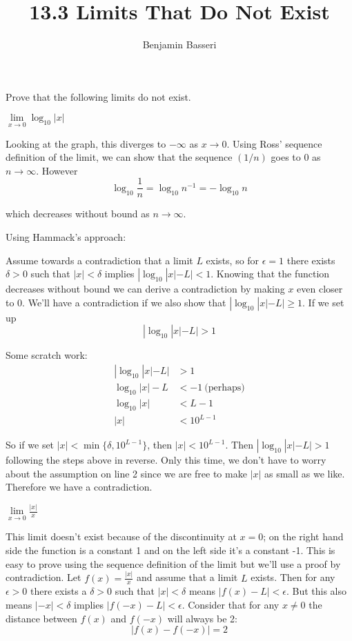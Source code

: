 \documentclass{article}
\title{13.3 Limits That Do Not Exist}
\author{Benjamin Basseri}
\begin{document}
\maketitle
Prove that the following limits do not exist.
\begin{problem}
$\lim\limits_{x \to 0} \log_{10} |x|$
\end{problem}
Looking at the graph, this diverges to $-\infty$ as $x \to 0$. Using Ross' sequence definition of the limit, we can show that the sequence $(1/n)$ goes to 0 as $n \to \infty$. However
$$\log_{10} \frac{1}{n} = \log_{10} n^{-1} = - \log_{10} n$$

which decreases without bound as $n \to \infty$.


Using Hammack's approach:

Assume towards a contradiction that a limit $L$ exists, so for $\epsilon = 1$ there exists $\delta > 0$ such that $|x| < \delta$ implies $|\log_{10} |x| - L | < 1$. Knowing that the function decreases without bound we can derive a contradiction by making $x$ even closer to 0. We'll have a contradiction if we also show that $|\log_{10}|x| - L | \geq 1$. If we set up
$$|\log_{10} |x| - L | > 1$$

Some scratch work:
\begin{align*}
  |\log_{10} |x| - L | & > 1                     \\
  \log_{10} |x| - L    & < -1 \ \text{(perhaps)} \\
  \log_{10} |x|        & < L - 1                 \\
  |x|                  & < 10^{L - 1}
\end{align*}

So if we set $|x| < \min\{\delta, 10^{L -1 }\}$, then $|x| < 10^{L - 1}$. Then $|\log_{10} |x| - L| > 1$ following the steps above in reverse. Only this time, we don't have to worry about the assumption on line 2 since we are free to make $|x|$ as small as we like. Therefore we have a contradiction.

\begin{problem}
$\lim\limits_{x \to 0} \frac{|x|}{x}$
\end{problem}

This limit doesn't exist because of the discontinuity at $x = 0$; on the right hand side the function is a constant 1 and on the left side it's a constant -1. This is easy to prove using the sequence definition of the limit but we'll use a proof by contradiction. Let $f(x) = \frac{|x|}{x}$ and assume that a limit $L$ exists. Then for any $\epsilon > 0$ there exists a $\delta > 0$ such that $|x| < \delta$ means $|f(x) - L| < \epsilon$. But this also means $|-x| < \delta$ implies $|f(-x) - L| < \epsilon$. Consider that for any $x \neq 0$ the distance between $f(x)$ and $f(-x)$ will always be 2:
$$|f(x) - f(-x)| = 2$$
\end{document}

